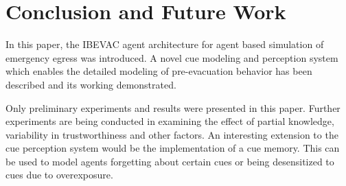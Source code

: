 \section{Conclusion and Future Work}
\label{ConclusionAndFutureWork}

In this paper, the IBEVAC agent architecture for agent based simulation of emergency egress was introduced. A novel cue modeling and perception system which enables the detailed modeling of pre-evacuation behavior has been described and its working demonstrated.

Only preliminary experiments and results were presented in this paper. Further experiments are being conducted in examining the effect of partial knowledge, variability in trustworthiness and other factors. An interesting extension to the cue perception system would be the implementation of a cue memory. This can be used to model agents forgetting about certain cues or being desensitized to cues due to overexposure.